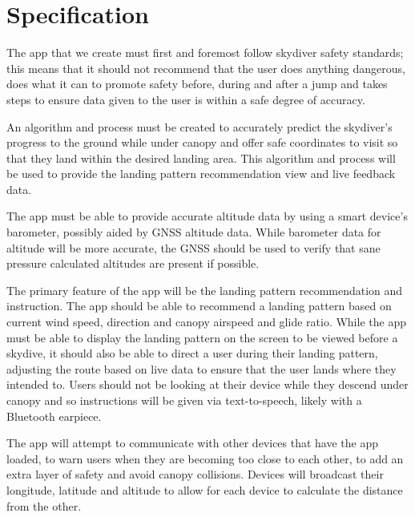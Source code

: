 \documentclass[11pt, a4paper, twocolumn]{article}
\begin{document}
\section{Specification}\label{sec:specification} %

The app that we create must first and foremost follow skydiver safety standards; this means that it should not recommend that the user does anything dangerous, does what it can to promote safety before, during and after a jump and takes steps to ensure data given to the user is within a safe degree of accuracy.

An algorithm and process must be created to accurately predict the skydiver's progress to the ground while under canopy and offer safe coordinates to visit so that they land within the desired landing area. This algorithm and process will be used to provide the landing pattern recommendation view and live feedback data.

The app must be able to provide accurate altitude data by using a smart device's barometer, possibly aided by GNSS altitude data. While barometer data for altitude will be more accurate, the GNSS should be used to verify that sane pressure calculated altitudes are present if possible.

The primary feature of the app will be the landing pattern recommendation and instruction. The app should be able to recommend a landing pattern based on current wind speed, direction and canopy airspeed and glide ratio. While the app must be able to display the landing pattern on the screen to be viewed before a skydive, it should also be able to direct a user during their landing pattern, adjusting the route based on live data to ensure that the user lands where they intended to. Users should not be looking at their device while they descend under canopy and so instructions will be given via text-to-speech, likely with a Bluetooth earpiece.

The app will attempt to communicate with other devices that have the app loaded, to warn users when they are becoming too close to each other, to add an extra layer of safety and avoid canopy collisions. Devices will broadcast their longitude, latitude and altitude to allow for each device to calculate the distance from the other.
\end{document}
